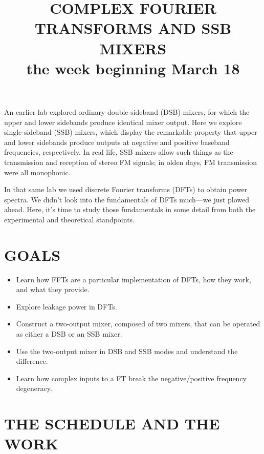 \documentclass[11pt,preprint]{aastex}
\begin{document}
\def\simlt{\lower.5ex\hbox{$\; \buildrel < \over \sim \;$}}
\def\simgt{\lower.5ex\hbox{$\; \buildrel > \over \sim \;$}}


\title {COMPLEX FOURIER TRANSFORMS AND SSB MIXERS \\
the week beginning March 18}

An earlier lab explored ordinary double-sideband (DSB) mixers, for which
the upper and lower sidebands produce identical mixer output. Here we
explore single-sideband (SSB) mixers, which display the remarkable
property that upper and lower sidebands produce outputs at negative and
positive baseband frequencies, respectively. In real life, SSB mixers
allow such things as the transmission and reception of stereo FM
signals; in olden days, FM transmission were all monophonic.

In that same lab we used discrete Fourier transforms (DFTs) to obtain
power spectra. We didn't look into the fundamentals of DFTs much---we
just plowed ahead. Here, it's time to study those fundamentals in some
detail from both the experimental and theoretical standpoints.

\section{GOALS}

\begin{itemize}

\item Learn how FFTs are a particular implementation of DFTs, how they
work, and what they provide.

\item Explore leakage power in DFTs.

\item Construct a two-output mixer, composed of two mixers, that can be
  operated as either a DSB or an SSB mixer. 

\item Use the two-output mixer in DSB and SSB modes and understand the
  difference. 

\item Learn how complex inputs to a FT break the negative/positive
  frequency degeneracy.

\end{itemize}


\section{THE SCHEDULE AND THE WORK}
\end{document}
